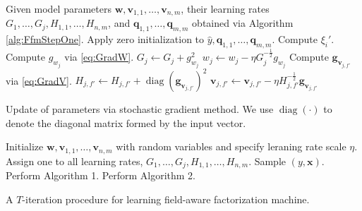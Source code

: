 \documentclass[11pt]{article}
\newcommand{\bsym}[1]{\ensuremath{\boldsymbol{#1}}}
\newcommand{\bw}{\ensuremath{\bsym{w}}}
\newcommand{\bg}{\ensuremath{\bsym{g}}}
\newcommand{\bv}{\ensuremath{\bsym{v}}}
\newcommand{\bx}{\ensuremath{\bsym{x}}}
\newcommand{\bq}{\ensuremath{\bsym{q}}}
\DeclareMathOperator*{\diag}{diag}
\begin{document}
\begin{algorithm}
    \begin{algorithmic}[1]
        \State Given model parameters $\bw,\bv_{1,1},\dots,\bv_{n,m}$, their learning rates $G_1,\dots,G_j,H_{1,1},\dots,H_{n,m}$, and $\bq_{1,1},\dots,\bq_{m,m}$ obtained via Algorithm \ref{alg:FfmStepOne}.
        \State Apply zero initialization to $\hat{y},\bq_{1,1},\dots,\bq_{m,m}$.
        \State Compute $\xi_i'$.
            \EndIf
            \State Compute $g_{w_j}$ via \eqref{eq:GradW}.
            \State $G_j \gets G_j + g_{w_j}^2$ 
            \State $w_j \gets w_j - \eta G_j^{-\frac{1}{2}} g_{w_j}$ 
        \EndFor
            \EndIf
                \State Compute $\bg_{\bv_{j,f'}}$ via \eqref{eq:GradV}.
                \State $H_{j,f'}  \gets H_{j,f'} + \diag(\bg_{\bv_{j,f'}})^2$ 
                \State $\bv_{j,f'} \gets \bv_{j,f'} - \eta H_{j,f'}^{-\frac{1}{2}} \bg_{\bv_{j,f'}}$ 
            \EndFor
        \EndFor
    \end{algorithmic}
    \label{alg:FfmStepTwo}
    \caption{Update of parameters via stochastic gradient method. We use $\diag(\cdot)$ to denote the diagonal matrix formed by the input vector.}
\end{algorithm}
\begin{algorithm}
    \begin{algorithmic}[1]
        \State Initialize $\bw,\bv_{1,1},\dots,\bv_{n,m}$ with random variables and specify leraning rate scale $\eta$.
        \State Assign one to all learning rates, $G_1,\dots,G_j,H_{1,1},\dots,H_{n,m}$.
            \State Sample $(y, \bx)$.
            \State Perform Algorithm 1.
            \State Perform Algorithm 2.
        \EndFor
    \end{algorithmic}
    \label{alg:Main}
    \caption{A $T$-iteration procedure for learning field-aware factorization machine.}
\end{algorithm}
\end{document}
